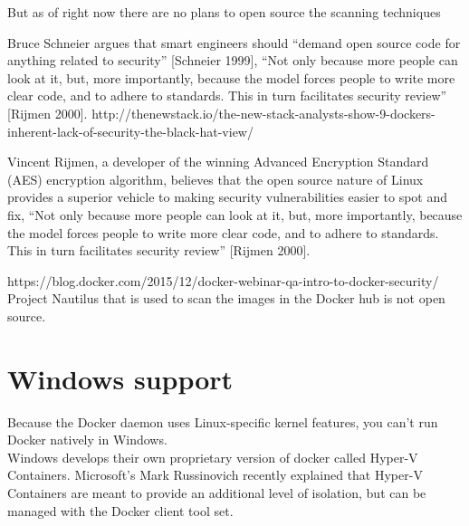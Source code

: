 
But as of right now there are no plans to open source the scanning techniques


Bruce Schneier argues that smart engineers should “demand open source code for anything related to security” [Schneier 1999],
“Not only because more people can look at it, but, more importantly, because the model forces people to write more clear code, and to adhere to standards. This in turn facilitates security review” [Rijmen 2000].
http://thenewstack.io/the-new-stack-analysts-show-9-dockers-inherent-lack-of-security-the-black-hat-view/

Vincent Rijmen, a developer of the winning Advanced Encryption Standard (AES) encryption algorithm, believes that the open source nature of Linux provides a superior vehicle to making security vulnerabilities easier to spot and fix, “Not only because more people can look at it, but, more importantly, because the model forces people to write more clear code, and to adhere to standards. This in turn facilitates security review” [Rijmen 2000].

https://blog.docker.com/2015/12/docker-webinar-qa-intro-to-docker-security/
Project Nautilus that is used to scan the images in the Docker hub is not open source.

\section{Windows support}
Because the Docker daemon uses Linux-specific kernel features, you can’t run Docker natively in Windows. \\

Windows develops their own proprietary version of docker called Hyper-V Containers.
Microsoft's Mark Russinovich recently explained that Hyper-V Containers are meant to provide an additional level of isolation, but can be managed with the Docker client tool set.



